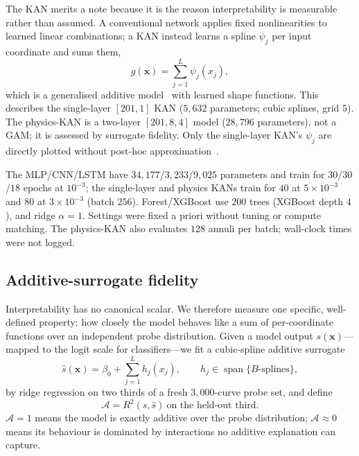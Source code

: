 \documentclass[manuscript,nonacm]{acmart}
\begin{document}
The KAN merits a note because it is the reason interpretability is measurable rather
than assumed. A conventional network applies fixed nonlinearities to learned linear
combinations; a KAN instead learns a spline $\psi_j$ per input coordinate and sums them,
\begin{equation}
g(\mathbf{x})=\sum_{j=1}^{L}\psi_j(x_j),
\label{eq:kan}
\end{equation}
which is a generalised additive model~\cite{hastie1990gam} with learned shape functions.
This describes the single-layer $[201,1]$ KAN ($5{,}632$ parameters; cubic splines,
grid $5$). The physics-KAN is a two-layer $[201,8,4]$ model ($28{,}796$ parameters), not
a GAM; it is assessed by surrogate fidelity. Only the single-layer KAN's $\psi_j$ are
directly plotted without post-hoc approximation~\cite{ribeiro2016lime}.

The MLP/CNN/LSTM have $34{,}177$/$3{,}233$/$9{,}025$ parameters and train for
$30$/$30$/$18$ epochs at $10^{-3}$; the single-layer and physics KANs train for $40$ at
$5\times10^{-3}$ and $80$ at $3\times10^{-3}$ (batch $256$). Forest/XGBoost use $200$
trees (XGBoost depth $4$), and ridge $\alpha=1$. Settings were fixed a priori without
tuning or compute matching. The physics-KAN also evaluates $128$ annuli per batch;
wall-clock times were not logged.

\subsection{Additive-surrogate fidelity}
Interpretability has no canonical scalar. We therefore measure one specific, well-defined
property: how closely the model behaves like a sum of per-coordinate functions over an
independent probe distribution. Given a model output $s(\mathbf{x})$---mapped to the
logit scale for classifiers---we fit a cubic-spline additive surrogate
\begin{equation}
\hat{s}(\mathbf{x})=\beta_0+\sum_{j=1}^{L}h_j(x_j),
\qquad h_j\in\operatorname{span}\{B\text{-splines}\},
\label{eq:surrogate}
\end{equation}
by ridge regression on two thirds of a fresh $3{,}000$-curve probe set, and define
\begin{equation}
\mathcal{A}=R^{2}\!\left(s,\hat{s}\right)\ \text{on the held-out third}.
\label{eq:additivity}
\end{equation}
$\mathcal{A}=1$ means the model is exactly additive over the probe distribution;
$\mathcal{A}\approx0$ means its behaviour is dominated by interactions no additive
explanation can capture.
\end{document}
